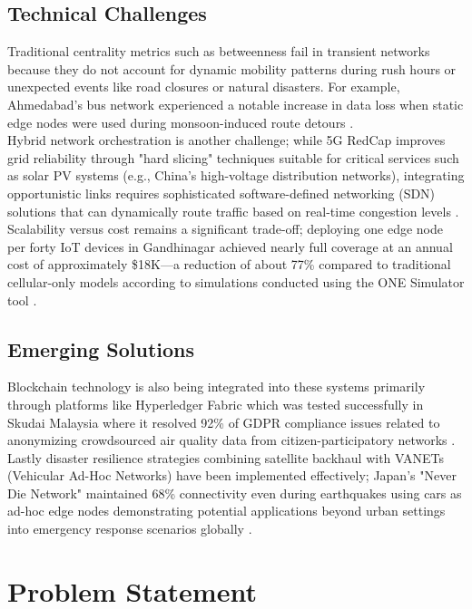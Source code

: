 \documentclass[12pt,a4paper]{report}
\begin{document}
\subsection{Technical Challenges}
Traditional centrality metrics such as betweenness fail in transient networks because
they do not account for dynamic mobility patterns during rush hours or unexpected
events like road closures or natural disasters. For example, Ahmedabad's bus network
experienced a notable increase in data loss when static edge nodes were used during
monsoon-induced route detours \cite{Gandhi_2023}.\\
Hybrid network orchestration is another challenge; while 5G RedCap improves grid
reliability through "hard slicing" techniques suitable for critical services such
as solar PV systems (e.g., China's high-voltage distribution networks), integrating
opportunistic links requires sophisticated software-defined networking (SDN)
solutions that can dynamically route traffic based on real-time congestion levels \cite{GSMA2024} \cite{Liu_2024}.\pagebreak \\
Scalability versus cost remains a significant trade-off; deploying one edge node
per forty IoT devices in Gandhinagar achieved nearly full coverage at an annual
cost of approximately \$18K—a reduction of about 77\% compared to traditional
cellular-only models according to simulations conducted using the ONE Simulator tool \cite{Gandhi_2023}.
\subsection{Emerging Solutions}
Blockchain technology is also being integrated into these systems primarily through
platforms like Hyperledger Fabric which was tested successfully in Skudai Malaysia
where it resolved 92\% of GDPR compliance issues related to anonymizing crowdsourced
air quality data from citizen-participatory networks \cite{Alasbali_2022}.\\
Lastly disaster resilience strategies combining satellite backhaul with VANETs
(Vehicular Ad-Hoc Networks) have been implemented effectively; Japan's "Never Die Network"
maintained 68\% connectivity even during earthquakes using cars as ad-hoc edge nodes
demonstrating potential applications beyond urban settings into emergency response
scenarios globally \cite{Andersson_2014}.

\section{Problem Statement}
\end{document}
